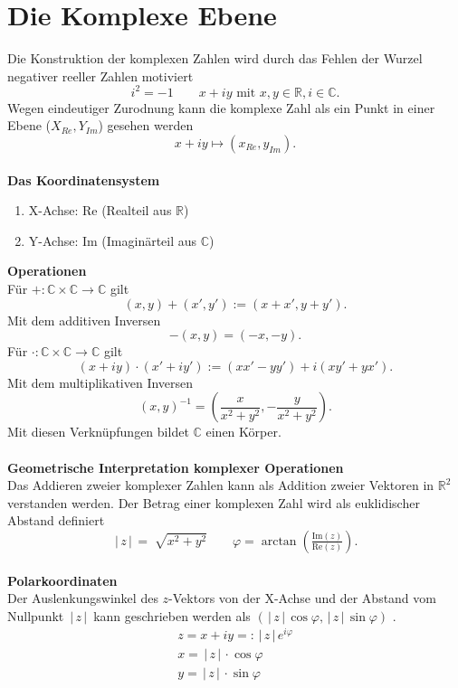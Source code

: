 \documentclass[a4paper,12pt]{article}
\numberwithin{equation}{section}
\begin{document}
\section{Die Komplexe Ebene}
Die Konstruktion der komplexen Zahlen wird durch das Fehlen der Wurzel negativer reeller Zahlen motiviert
\[ 
i^{2}=-1\qquad x+iy\text{ mit }x,y \in \mathbb{R},i \in \mathbb{C}
.\] 
Wegen eindeutiger Zurodnung kann die komplexe Zahl als ein Punkt in einer Ebene ($X_{Re},Y_{Im}$) gesehen werden
\[ 
x+iy\mapsto\left(x_{Re},y_{Im}\right)
.\] 
\hfill\\\textbf{Das Koordinatensystem}
\begin{enumerate}[label=]
        \item X-Achse: Re (Realteil aus $\mathbb{R}$)
        \item Y-Achse: Im (Imaginärteil aus $\mathbb{C}$)
\end{enumerate}
\textbf{Operationen}\\
Für $+:\mathbb{C}\times \mathbb{C}\rightarrow \mathbb{C}$ gilt
\[ 
        \left(x,y\right)+\left(x',y'\right):=\left(x+x',y+y'\right)
.\] 
Mit dem additiven Inversen
\[ 
        -\left(x,y\right)=\left(-x,-y\right)
.\] 
Für $\cdot :\mathbb{C}\times \mathbb{C}\rightarrow \mathbb{C}$ gilt
\[ 
        \left(x+iy\right)\cdot \left(x'+iy'\right):=\left(xx'-yy'\right)+i\left(xy'+yx'\right)
.\] 
Mit dem multiplikativen Inversen
\[ 
        \left(x,y\right)^{-1}=\left(\dfrac{x}{x^2+y^2},-\dfrac{y}{x^2+y^2}\right)
.\] 
Mit diesen Verknüpfungen bildet $\mathbb{C}$ einen Körper.
\\\hfill\\\textbf{Geometrische Interpretation komplexer Operationen}\\
Das Addieren zweier komplexer Zahlen kann als Addition zweier Vektoren in $\mathbb{R}^2$ verstanden werden. Der Betrag einer komplexen Zahl wird als euklidischer Abstand definiert
\[
        \,|\, z\,|\, =\sqrt[]{x^2+y^2}\qquad \varphi =\arctan\left(\tfrac{\text{Im}\left(z\right)}{\text{Re}\left(z\right)}\right)
.\]
\hfill\\\textbf{Polarkoordinaten}\\
Der Auslenkungswinkel des $z$-Vektors von der X-Achse und der Abstand vom Nullpunkt $\,|\, z\,|\, $ kann geschrieben werden als $\left(\,|\, z\,|\, \cos \varphi ,\,|\, z\,|\, \sin \varphi\right)$ .
\begin{gather*}
        z=x+iy=:\,|\, z\,|\, e^{i\varphi }\\
        x=\,|\, z\,|\, \cdot \cos \varphi \\
        y=\,|\, z\,|\, \cdot \sin \varphi
\end{gather*}
\end{document}
